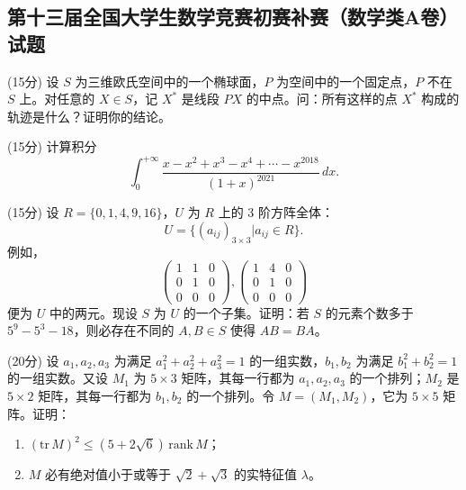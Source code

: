\documentclass[loose]{ExBook}
\begin{document}
\subsection{第十三届全国大学生数学竞赛初赛补赛（数学类A卷）试题}
\begin{qitems}
    \begin{bbox}
        \qitem (15分) 设 \( S \) 为三维欧氏空间中的一个椭球面，\( P \) 为空间中的一个固定点，\( P \) 不在 \( S \) 上。对任意的 \( X \in S \)，记 \( X^* \) 是线段 \( PX \) 的中点。问：所有这样的点 \( X^* \) 构成的轨迹是什么？证明你的结论。
    \end{bbox}

    \begin{bbox}
        \qitem (15分) 计算积分 
        \[ 
        \int_{0}^{+\infty} \frac{x - x^2 + x^3 - x^4 + \cdots - x^{2018}}{(1 + x)^{2021}} \, dx. 
        \]
    \end{bbox}

    \begin{bbox}
        \qitem (15分) 设 \( R = \{0, 1, 4, 9, 16\} \)，\( U \) 为 \( R \) 上的 3 阶方阵全体：
        \[ 
        U = \{(a_{ij})_{3 \times 3} | a_{ij} \in R\}. 
        \]
        例如，
        \[
        \begin{pmatrix}
        1 & 1 & 0 \\
        0 & 1 & 0 \\
        0 & 0 & 0
        \end{pmatrix},
        \begin{pmatrix}
        1 & 4 & 0 \\
        0 & 1 & 0 \\
        0 & 0 & 0
        \end{pmatrix}
        \]
        便为 \( U \) 中的两元。现设 \( S \) 为 \( U \) 的一个子集。证明：若 \( S \) 的元素个数多于 \( 5^9 - 5^3 - 18 \)，则必存在不同的 \( A, B \in S \) 使得 \( AB = BA \)。
    \end{bbox}

    \begin{bbox}
        \qitem (20分) 设 \( a_1, a_2, a_3 \) 为满足 \( a_1^2 + a_2^2 + a_3^2 = 1 \) 的一组实数，\( b_1, b_2 \) 为满足 \( b_1^2 + b_2^2 = 1 \) 的一组实数。又设 \( M_1 \) 为 \( 5 \times 3 \) 矩阵，其每一行都为 \( a_1, a_2, a_3 \) 的一个排列；\( M_2 \) 是 \( 5 \times 2 \) 矩阵，其每一行都为 \( b_1, b_2 \) 的一个排列。令 \( M = (M_1, M_2) \)，它为 \( 5 \times 5 \) 矩阵。证明：

        \begin{enumerate}[label=(\arabic*)]
            \item \( (\mathrm{tr} \, M)^2 \leq (5 + 2\sqrt{6}) \, \mathrm{rank} \, M \)；
            \item \( M \) 必有绝对值小于或等于 \( \sqrt{2} + \sqrt{3} \) 的实特征值 \( \lambda \)。
        \end{enumerate}
    \end{bbox}


\end{qitems}
\end{document}

